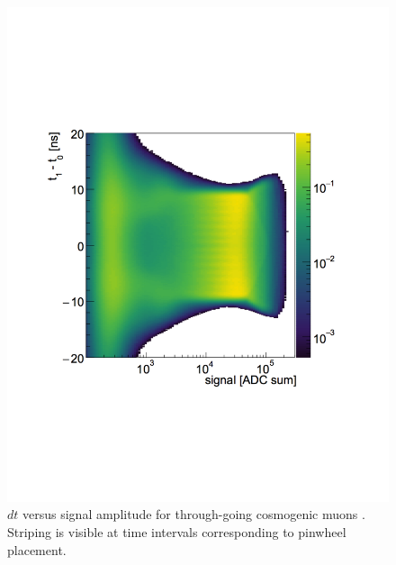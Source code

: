 \begin{figure}[h]
	\begin{minipage}[h]{0.5\linewidth}
		\centering
		\includegraphics[width=0.95\linewidth]{tex/5-analysis-images/dt_S_Hobbes}
		\caption[Muon $dt$ versus signal amplitude]{$dt$ versus signal amplitude for through-going cosmogenic muons \cite{MM:2314}. Striping is visible at time intervals corresponding to pinwheel placement.}
		\label{fig:dtshobbes}
	\end{minipage}
	\begin{minipage}[h]{0.5\linewidth}
		\centering

\end{minipage}
\end{figure}
